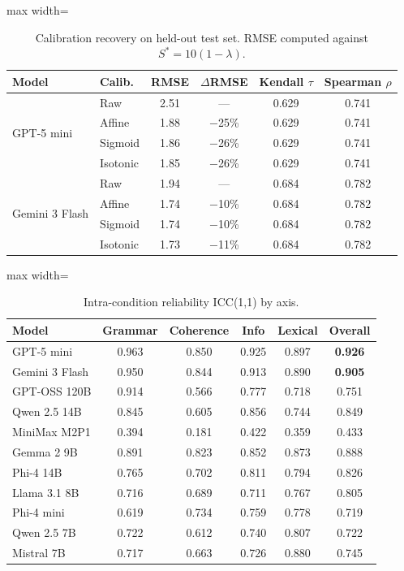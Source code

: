 \documentclass[11pt]{article}
\begin{document}
\begin{table}[H]
\centering
\caption{Calibration recovery on held-out test set. RMSE computed
against $S^* = 10(1 - \lambda)$.}
\label{tab:calibration_app}
\begin{adjustbox}{max width=\columnwidth}
\begin{tabular}{@{}llcccc@{}}
\toprule
\textbf{Model} & \textbf{Calib.} & \textbf{RMSE} &
$\Delta$\textbf{RMSE} & \textbf{Kendall} $\tau$ &
\textbf{Spearman} $\rho$ \\
\midrule
\multirow{4}{*}{GPT-5 mini}
    & Raw      & 2.51 & ---    & 0.629 & 0.741 \\
    & Affine   & 1.88 & $-$25\% & 0.629 & 0.741 \\
    & Sigmoid  & 1.86 & $-$26\% & 0.629 & 0.741 \\
    & Isotonic & 1.85 & $-$26\% & 0.629 & 0.741 \\
\midrule
\multirow{4}{*}{Gemini 3 Flash}
    & Raw      & 1.94 & ---    & 0.684 & 0.782 \\
    & Affine   & 1.74 & $-$10\% & 0.684 & 0.782 \\
    & Sigmoid  & 1.74 & $-$10\% & 0.684 & 0.782 \\
    & Isotonic & 1.73 & $-$11\% & 0.684 & 0.782 \\
\bottomrule
\end{tabular}
\end{adjustbox}
\end{table}

\begin{table}[H]
\centering
\caption{Intra-condition reliability ICC(1,1) by axis.}
\label{tab:icc_app}
\small
\begin{adjustbox}{max width=\columnwidth}
\begin{tabular}{@{}lccccc@{}}
\toprule
\textbf{Model} & \textbf{Grammar} & \textbf{Coherence} &
\textbf{Info} & \textbf{Lexical} & \textbf{Overall} \\
\midrule
GPT-5 mini     & 0.963 & 0.850 & 0.925 & 0.897 & \textbf{0.926} \\
Gemini 3 Flash & 0.950 & 0.844 & 0.913 & 0.890 & \textbf{0.905} \\
GPT-OSS 120B   & 0.914 & 0.566 & 0.777 & 0.718 & 0.751 \\
Qwen 2.5 14B   & 0.845 & 0.605 & 0.856 & 0.744 & 0.849 \\
MiniMax M2P1   & 0.394 & 0.181 & 0.422 & 0.359 & 0.433 \\
Gemma 2 9B     & 0.891 & 0.823 & 0.852 & 0.873 & 0.888 \\
Phi-4 14B      & 0.765 & 0.702 & 0.811 & 0.794 & 0.826 \\
Llama 3.1 8B   & 0.716 & 0.689 & 0.711 & 0.767 & 0.805 \\
Phi-4 mini     & 0.619 & 0.734 & 0.759 & 0.778 & 0.719 \\
Qwen 2.5 7B    & 0.722 & 0.612 & 0.740 & 0.807 & 0.722 \\
Mistral 7B     & 0.717 & 0.663 & 0.726 & 0.880 & 0.745 \\
\bottomrule
\end{tabular}
\end{adjustbox}
\end{table}
\end{document}
